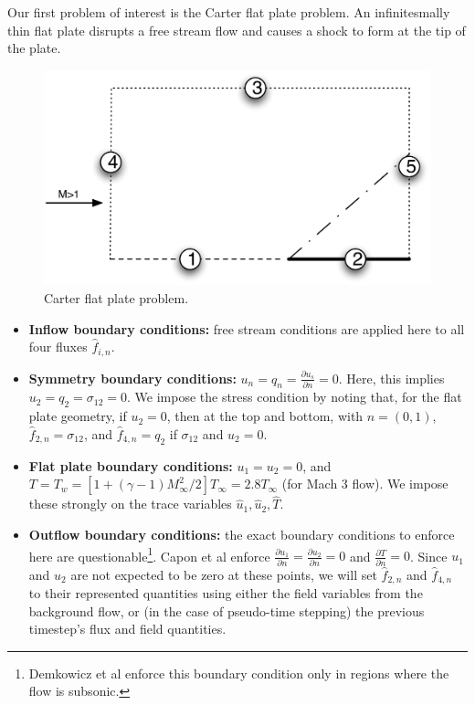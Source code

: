 \documentclass{article}
\newcommand{\pd}[2]{\frac{\partial#1}{\partial#2}}
\begin{document}
Our first problem of interest is the Carter flat plate problem. An infinitesmally thin flat plate disrupts a free stream flow and causes a shock to form at the tip of the plate. 

\begin{figure}[!h]
\centering
\includegraphics[scale=.5]{flat_plate_BCs.pdf}
\caption{Carter flat plate problem.}
\end{figure}

\begin{itemize}
\item \textbf{Inflow boundary conditions:} free stream conditions are applied here to all four fluxes $\widehat{f}_{i,n}$.
\item \textbf{Symmetry boundary conditions:} $u_n = q_n = \pd{u_s}{n} = 0$. Here, this implies $u_2 = q_2 = \sigma_{12} = 0$. We impose the stress condition by noting that, for the flat plate geometry, if $u_2 = 0$, then at the top and bottom, with $n = (0,1)$, $\widehat{f}_{2,n} = \sigma_{12}$, and $\widehat{f}_{4,n} = q_2$ if $\sigma_{12}$ and $u_2 = 0$. 
\item \textbf{Flat plate boundary conditions:} $u_1 = u_2 = 0$, and $T = T_w = \left[1+(\gamma-1)M_\infty^2/2\right] T_\infty = 2.8T_\infty$ (for Mach 3 flow). We impose these strongly on the trace variables $\widehat{u}_1, \widehat{u}_2, \widehat{T}$. 
\item \textbf{Outflow boundary conditions:} the exact boundary conditions to enforce here are questionable\footnote{Demkowicz et al enforce this boundary condition only in regions where the flow is subsonic.}. Capon et al enforce $\pd{u_1}{n}=\pd{u_2}{n}=0$ and $\pd{T}{n} = 0$. Since $u_1$ and $u_2$ are not expected to be zero at these points, we will set $\widehat{f}_{2,n}$ and $\widehat{f}_{4,n}$ to their represented quantities using either the field variables from the background flow, or (in the case of pseudo-time stepping) the previous timestep's flux and field quantities. 
\end{itemize}
\end{document}
